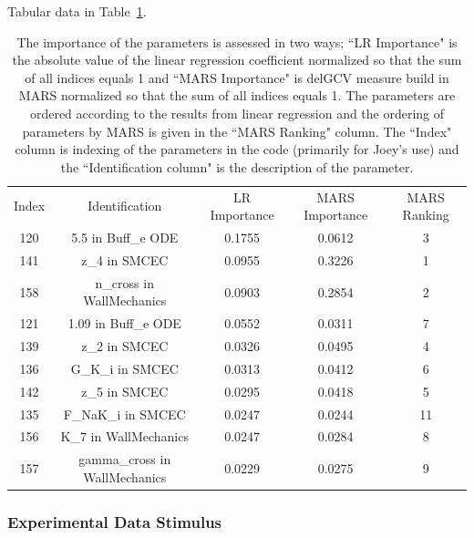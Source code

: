 \documentclass[12pt]{article}
\numberwithin{equation}{section}
\begin{document}
Tabular data in Table~\ref{qoi_vol_flow_rec}.

\begin{table}[h]
\centering
\begin{tabular}{ccccc}
Index & Identification & LR Importance & MARS Importance & MARS Ranking \\
   120 & 5.5 in Buff\_e ODE & 0.1755 & 0.0612 & 3\\
   141 & z\_4 in SMCEC &  0.0955 & 0.3226 & 1\\
   158 & n\_cross in WallMechanics & 0.0903 & 0.2854 & 2\\
   121 & 1.09 in Buff\_e ODE & 0.0552 & 0.0311 & 7\\
   139 & z\_2 in SMCEC & 0.0326 & 0.0495 & 4\\
   136 & G\_K\_i in SMCEC & 0.0313 & 0.0412 & 6\\
   142 & z\_5 in SMCEC & 0.0295 & 0.0418 & 5\\
   135 & F\_NaK\_i in SMCEC & 0.0247 & 0.0244 & 11\\
   156 & K\_7 in WallMechanics & 0.0247 & 0.0284 & 8\\
   157 & gamma\_cross in WallMechanics & 0.0229 & 0.0275 & 9
\end{tabular}
\caption{The importance of the parameters is assessed in two ways; ``LR Importance" is the absolute value of the linear regression coefficient normalized so that the sum of all indices equals 1 and ``MARS Importance" is delGCV measure build in MARS normalized so that the sum of all indices equals 1. The parameters are ordered according to the results from linear regression and the ordering of parameters by MARS is given in the ``MARS Ranking" column. The ``Index" column is indexing of the parameters in the code (primarily for Joey's use) and the ``Identification column" is the description of the parameter.}
\label{qoi_vol_flow_rec}
\end{table}

\newpage

\subsubsection{Experimental Data Stimulus}
\end{document}
